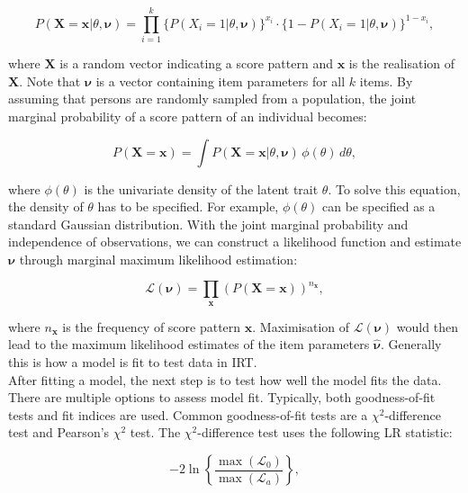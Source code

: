 \documentclass[Royal,sageapa,times,doublespace]{sagej}
\begin{document}
\begin{equation}
P(\boldsymbol{X} = \boldsymbol{x} | \theta, \boldsymbol{\nu}) = \prod_{i=1}^{k} \{P(X_i = 1 | \theta, \boldsymbol{\nu})\}^{x_i} \cdot  \{1 - P(X_i = 1 | \theta, \boldsymbol{\nu}) \}^{1 - x_i},
\end{equation}

where $\boldsymbol{X}$ is a random vector indicating a score pattern and $\boldsymbol{x}$ is the realisation of $\boldsymbol{X}$. Note that $\boldsymbol{\nu}$ is a vector containing item parameters for all $k$ items. By assuming that persons are randomly sampled from a population, the joint marginal probability of a score pattern of an individual becomes:

\begin{equation}
P(\boldsymbol{X} = \boldsymbol{x}) = \int P(\boldsymbol{X} = \boldsymbol{x} | \theta, \boldsymbol{\nu}) \,\phi(\theta)\,d\theta,
\end{equation}

where $\phi(\theta)$ is the univariate density of the latent trait $\theta$. To solve this equation, the density of $\theta$ has to be specified. For example, $\phi(\theta)$ can be specified as a standard Gaussian distribution. With the joint marginal probability and independence of observations, we can construct a likelihood function and estimate $\boldsymbol{\nu}$ through marginal maximum likelihood estimation:

\begin{equation}
\mathcal{L}(\boldsymbol{\nu}) = \prod_{\boldsymbol{x}} (P(\boldsymbol{X} = \boldsymbol{x}))^{n_{\boldsymbol{x}}},
\end{equation}

where $n_{\boldsymbol{x}}$ is the frequency of score pattern $\boldsymbol{x}$. Maximisation of $\mathcal{L}(\boldsymbol{\nu})$ would then lead to the maximum likelihood estimates of the item parameters $\boldsymbol{\hat{\nu}}$. Generally this is how a model is fit to test data in IRT. \\
\indent After fitting a model, the next step is to test how well the model fits the data. There are multiple options to assess model fit. Typically, both goodness-of-fit tests and fit indices are used. Common goodness-of-fit tests are a $\chi^2$-difference test and Pearson's $\chi^2$ test. The $\chi^2$-difference test uses the following LR statistic:

\begin{equation}
- 2 \ln \left \{ \frac{\max(\mathcal{L}_0)}{\max(\mathcal{L}_a)} \right \},
\end{equation}
\end{document}
